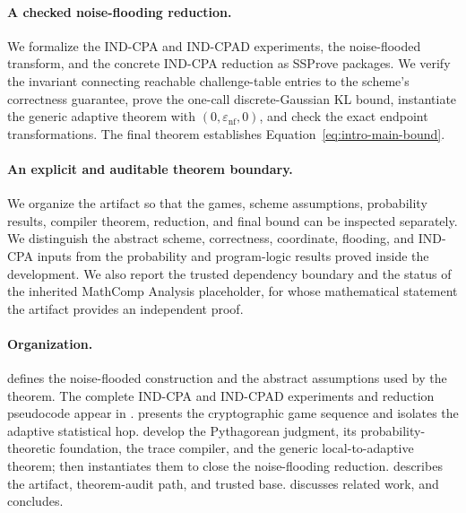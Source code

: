 \paragraph{A checked noise-flooding reduction.}
We formalize the IND-CPA and IND-CPAD experiments, the noise-flooded transform, and the concrete IND-CPA reduction as SSProve packages. We verify the invariant connecting reachable challenge-table entries to the scheme's correctness guarantee, prove the one-call discrete-Gaussian KL bound, instantiate the generic adaptive theorem with $\left(0,\varepsilon_{\mathrm{nf}},0\right)$, and check the exact endpoint transformations. The final theorem establishes Equation~\eqref{eq:intro-main-bound}.

\paragraph{An explicit and auditable theorem boundary.}
We organize the artifact so that the games, scheme assumptions, probability results, compiler theorem, reduction, and final bound can be inspected separately. We distinguish the abstract scheme, correctness, coordinate, flooding, and IND-CPA inputs from the probability and program-logic results proved inside the development. We also report the trusted dependency boundary and the status of the inherited MathComp Analysis placeholder, for whose mathematical statement the artifact provides an independent proof.

\paragraph{Organization.}
 defines the noise-flooded construction and the abstract assumptions used by the theorem. The complete IND-CPA and IND-CPAD experiments and reduction pseudocode appear in .  presents the cryptographic game sequence and isolates the adaptive statistical hop.  develop the Pythagorean judgment, its probability-theoretic foundation, the trace compiler, and the generic local-to-adaptive theorem;  then instantiates them to close the noise-flooding reduction.  describes the artifact, theorem-audit path, and trusted base.  discusses related work, and  concludes.
